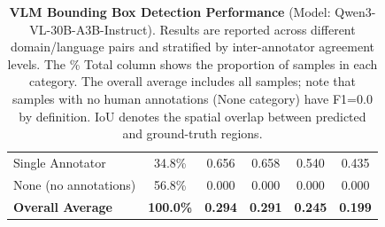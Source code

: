 \begin{table}[H]
\begin{tabular}{l c c c c c}
\hspace{3mm} Single Annotator & 34.8\% & 0.656 & 0.658 & 0.540 & 0.435 \\
\hspace{3mm} None (no annotations) & 56.8\% & 0.000 & 0.000 & 0.000 & 0.000 \\
\midrule
\textbf{Overall Average} & \textbf{100.0\%} & \textbf{0.294} & \textbf{0.291} & \textbf{0.245} & \textbf{0.199} \\
\bottomrule
\end{tabular}
\caption{\textbf{VLM Bounding Box Detection Performance} (Model: Qwen3-VL-30B-A3B-Instruct). Results are reported across different domain/language pairs and stratified by inter-annotator agreement levels. The \% Total column shows the proportion of samples in each category. The overall average includes all samples; note that samples with no human annotations (None category) have F1=0.0 by definition. IoU denotes the spatial overlap between predicted and ground-truth regions.}
\label{tab:appendix_performance_Qwen3-VL-30B-A3B-Instruct}
\end{table}